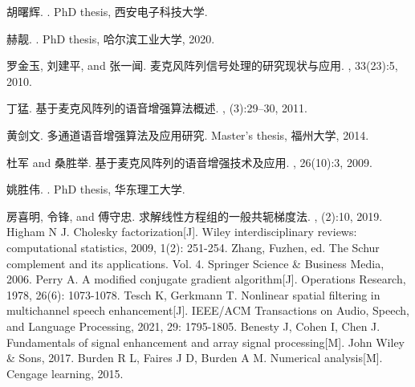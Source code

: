 \documentclass[10pt,a4paper,twocolumn]{PPRAcn} %
\begin{document}
\flushbottom %

\maketitle %
\small
\renewcommand\refname{参考文献}



\begin{thebibliography}{1}
	
	胡曙辉.
	.
	\newblock PhD thesis, 西安电子科技大学.
	
	赫靓.
	.
	\newblock PhD thesis, 哈尔滨工业大学, 2020.
	
	罗金玉, 刘建平, and 张一闻.
	\newblock 麦克风阵列信号处理的研究现状与应用.
	, 33(23):5, 2010.
	
	丁猛.
	\newblock 基于麦克风阵列的语音增强算法概述.
	, (3):29--30, 2011.
	
	黄剑文.
	\newblock 多通道语音增强算法及应用研究.
	\newblock Master's thesis, 福州大学, 2014.
	
	杜军 and 桑胜举.
	\newblock 基于麦克风阵列的语音增强技术及应用.
	, 26(10):3, 2009.
	
	姚胜伟.
	.
	\newblock PhD thesis, 华东理工大学.
	
	房喜明, 令锋, and 傅守忠.
	\newblock 求解线性方程组的一般共轭梯度法.
	, (2):10, 2019.
	Higham N J. Cholesky factorization[J]. Wiley interdisciplinary reviews: computational statistics, 2009, 1(2): 251-254.
	Zhang, Fuzhen, ed. The Schur complement and its applications. Vol. 4. Springer Science & Business Media, 2006.
	Perry A. A modified conjugate gradient algorithm[J]. Operations Research, 1978, 26(6): 1073-1078.
	Tesch K, Gerkmann T. Nonlinear spatial filtering in multichannel speech enhancement[J]. IEEE/ACM Transactions on Audio, Speech, and Language Processing, 2021, 29: 1795-1805.
	Benesty J, Cohen I, Chen J. Fundamentals of signal enhancement and array signal processing[M]. John Wiley & Sons, 2017.
	Burden R L, Faires J D, Burden A M. Numerical analysis[M]. Cengage learning, 2015.
\end{thebibliography}

\end{document}
